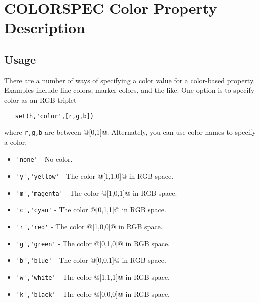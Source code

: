 \section{COLORSPEC Color Property Description}

\subsection{Usage}

There are a number of ways of specifying a color value for
a color-based property.  Examples include line colors, 
marker colors, and the like.  One option is to specify
color as an RGB triplet
\begin{verbatim}
   set(h,'color',[r,g,b])
\end{verbatim}
where \verb|r,g,b| are between @[0,1]@.  Alternately, you can
use color names to specify a color.
\begin{itemize}
\item  \verb|'none'| - No color.

\item  \verb|'y','yellow'| - The color @[1,1,0]@ in RGB space.

\item  \verb|'m','magenta'| - The color @[1,0,1]@ in RGB space.

\item  \verb|'c','cyan'| - The color @[0,1,1]@ in RGB space.

\item  \verb|'r','red'| - The color @[1,0,0]@ in RGB space.

\item  \verb|'g','green'| - The color @[0,1,0]@ in RGB space.

\item  \verb|'b','blue'| - The color @[0,0,1]@ in RGB space.

\item  \verb|'w','white'| - The color @[1,1,1]@ in RGB space.

\item  \verb|'k','black'| - The color @[0,0,0]@ in RGB space.

\end{itemize}
